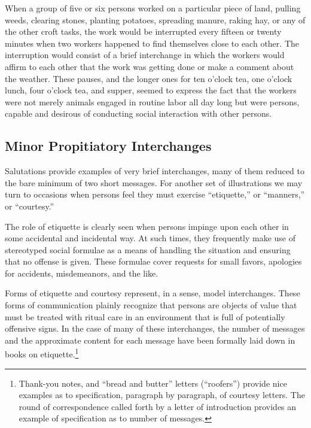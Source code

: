 \documentclass[openany,nobib]{tufte-book}
\begin{document}
When a group of five or six persons worked on a particular piece of
land, pulling weeds, clearing stones, planting potatoes, spreading
manure, raking hay, or any of the other croft tasks, the work would be
interrupted every fifteen or twenty minutes when two workers happened to
find themselves close to each other. The interruption would consist of a
brief interchange in which the workers would affirm to each other that
the work was getting done or make a comment about the weather. These
pauses, and the longer ones for ten o'clock tea, one o'clock lunch, four
o'clock tea, and supper, seemed to express the fact that the workers
were not merely animals engaged in routine labor all day long but were
persons, capable and desirous of conducting social interaction with
other persons.

\hypertarget{minor-propitiatory-interchanges}{%
\subsection{Minor Propitiatory
Interchanges}\label{minor-propitiatory-interchanges}}

Salutations provide examples of very brief interchanges, many of them
reduced to the bare minimum of two short messages. For another set of
illustrations we may turn to occasions when persons feel they must
exercise ``etiquette,'' or ``manners,'' or ``courtesy.''

The role of etiquette is clearly seen when persons impinge upon each
other in some accidental and incidental way. At such times, they
frequently make use of stereotyped social formulae as a means of
handling the situation and ensuring that no offense is given. These
formulae cover requests for small favors, apologies for accidents,
misdemeanors, and the like.

Forms of etiquette and courtesy represent, in a sense, model
interchanges. These forms of communication plainly recognize that
persons are objects of value that must be treated with ritual care in an
environment that is full of potentially offensive signs. In the case of
many of these interchanges, the number of messages and the approximate
content for each message have been formally laid down in books on
etiquette.\footnote{Thank-you notes, and ``bread and butter'' letters
  (``roofers'') provide nice examples as to specification, paragraph by
  paragraph, of courtesy letters. The round of correspondence called
  forth by a letter of introduction provides an example of specification
  as to number of messages.}
\end{document}
